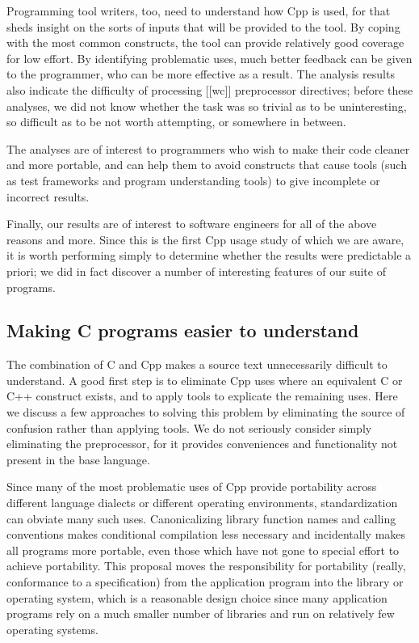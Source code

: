 \documentclass[10pt]{article}
\begin{document}

Programming tool writers, too, need to understand how Cpp is used, for that
sheds insight on the sorts of inputs that will be provided to the tool.  By
coping with the most common constructs, the tool can provide relatively
good coverage for low effort.  By identifying problematic uses, much better
feedback can be given to the programmer, who can be more effective as a
result.  The analysis results also indicate the difficulty of processing [[wc]]
preprocessor directives; before these analyses, we did not know whether the
task was so trivial as to be uninteresting, so difficult as to be not worth
attempting, or somewhere in between.

The analyses are of interest to programmers who wish to make their code
cleaner and more portable, and can help them to avoid constructs that cause
tools (such as test frameworks and program understanding tools)
to give incomplete or incorrect results.


Finally, our results are of interest to software engineers for all of the
above reasons and more.  Since this is the first Cpp usage study of which
we are aware, it is worth performing simply to determine whether the
results were predictable a priori; we did in fact discover a number of
interesting features of our suite of programs.


\subsection{Making C programs easier to understand}

The combination of C and Cpp makes a source text unnecessarily difficult to
understand.  A good first step is to eliminate Cpp uses where an equivalent
C or C++ construct exists, and to apply tools to explicate the remaining
uses.  Here we discuss a few approaches to solving this problem by
eliminating the source of confusion rather than applying tools.  We do not
seriously consider simply eliminating the preprocessor, for it provides
conveniences and functionality not present in the base language.

Since many of the most problematic uses of Cpp provide portability across
different language dialects or different operating environments,
standardization can obviate many such uses.  Canonicalizing library
function names and calling conventions makes conditional compilation less
necessary and incidentally makes all programs more portable, even those
which have not gone to special effort to achieve portability.  This
proposal moves the responsibility for portability (really, conformance to a
specification) from the application program into the library or operating
system, which is a reasonable design choice since many application programs
rely on a much smaller number of libraries and run on relatively few
operating systems.
\end{document}
